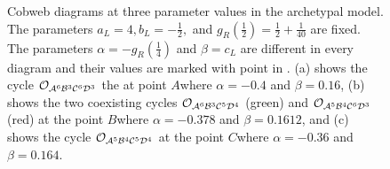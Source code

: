 \begin{figure}
	\centering
	\caption[Cobweb diagrams at three parameter values in the archetypal model]{
		Cobweb diagrams at three parameter values in the archetypal model.
		The parameters $a_L = 4, b_L = -\frac{1}{2},$ and $g_R\left(\frac{1}{2}\right) = \frac{1}{2} + \frac{1}{40}$ are fixed.
		The parameters $\alpha = -g_R\left(\frac{1}{4}\right)$ and $\beta = c_L$ are different in every diagram and their values are marked with point in .
		(a) shows the cycle $\mathcal{O}_{\mathcal{A}^6\mathcal{B}^3\mathcal{C}^6\mathcal{D}^3}$ the at point $A$where $\alpha = -0.4$ and $\beta = 0.16$,
		(b) shows the two coexisting cycles $\mathcal{O}_{\mathcal{A}^6\mathcal{B}^3\mathcal{C}^5\mathcal{D}^4}$ (green) and $\mathcal{O}_{\mathcal{A}^5\mathcal{B}^4\mathcal{C}^6\mathcal{D}^3}$ (red) at the point $B$where $\alpha = -0.378$ and $\beta = 0.1612$,
		and (c) shows the cycle $\mathcal{O}_{\mathcal{A}^5\mathcal{B}^4\mathcal{C}^5\mathcal{D}^4}$ at the point $C$where $\alpha = -0.36$ and $\beta = 0.164$.
	}
	\label{fig:setup.arch.cobwebs}
\end{figure}
